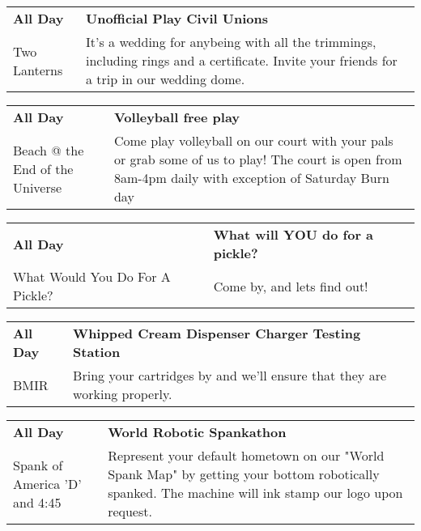 \begin{tabular}{ p{1in} p{2.2in} }
    \textbf{All Day} & \textbf{Unofficial Play Civil Unions} \\
    Two Lanterns \newline  & It's a wedding for anybeing with all the trimmings, including rings and a certificate.  Invite your friends for a trip in our wedding dome. \\
    \hline 
\end{tabular}
    
\begin{tabular}{ p{1in} p{2.2in} }
    \textbf{All Day} & \textbf{Volleyball free play } \\
    Beach @ the End of the Universe \newline  & Come play volleyball on our court with your pals or grab some of us to play! The court is open from 8am-4pm daily with exception of Saturday Burn day \\
    \hline 
\end{tabular}
    
\begin{tabular}{ p{1in} p{2.2in} }
    \textbf{All Day} & \textbf{What will YOU do for a pickle?} \\
    What Would You Do For A Pickle? \newline  & Come by, and lets find out! \\
    \hline 
\end{tabular}
    
\begin{tabular}{ p{1in} p{2.2in} }
    \textbf{All Day} & \textbf{Whipped Cream Dispenser Charger Testing Station} \\
    BMIR \newline  & Bring your cartridges by and we'll ensure that they are working properly. \\
    \hline 
\end{tabular}
    
\begin{tabular}{ p{1in} p{2.2in} }
    \textbf{All Day} & \textbf{World Robotic Spankathon} \\
    Spank of America \newline 'D' and 4:45 & Represent your default hometown on our "World Spank Map" by getting your bottom robotically spanked. The machine will ink stamp our logo upon request. \\
    \hline 
\end{tabular}
    
